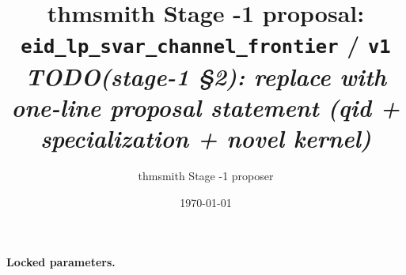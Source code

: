 \documentclass[11pt]{article}
\title{thmsmith Stage -1 proposal: \texttt{eid\_lp\_svar\_channel\_frontier} / \texttt{v1}%
  \\ \large\textit{TODO(stage-1 \S2): replace with one-line proposal statement (qid + specialization + novel kernel)}}
\author{thmsmith Stage -1 proposer}
\date{\today}
\theoremstyle{definition}
\theoremstyle{plain}
\theoremstyle{remark}
\begin{document}
\maketitle


\paragraph{Locked parameters.}

\begin{abstract}
\end{abstract}
\end{document}
